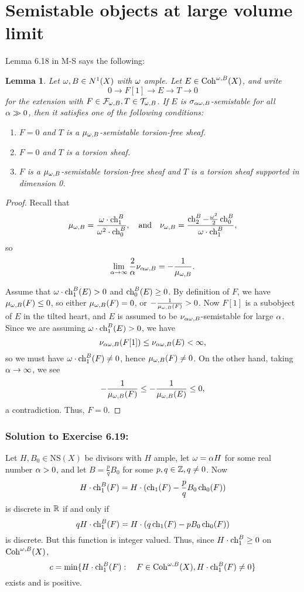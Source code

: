 \documentclass[letterpaper,10pt]{article}
\newtheorem{lem}[thm]{Lemma}
\begin{document}
\section{Semistable objects at large volume limit}
Lemma 6.18 in M-S says the following:
\begin{lem}
    Let $\omega, B \in N^1(X)$ with $\omega$ ample. Let $E \in \mathrm{Coh}^{\omega, B}(X)$, and write \[ 0 \to F[1] \to E \to T \to 0 \]
    for the extension with $F \in \mathcal{F}_{\omega, B}, T \in \mathcal{T}_{\omega, B}$. If $E$ is $\sigma_{\alpha\omega, B}$-semistable for all $\alpha \gg 0$, then it satisfies one of the following conditions:
    \begin{enumerate}[(1)]
        \item $F = 0$ and $T$ is a $\mu_{\omega, B}$-semistable torsion-free sheaf.
        \item $F = 0$ and $T$ is a torsion sheaf.
        \item $F$ is a $\mu_{\omega, B}$-semistable torsion-free sheaf and $T$ is a torsion sheaf supported in dimension 0.
    \end{enumerate}
\end{lem}
\begin{proof}
    Recall that
    \[ \mu_{\omega, B} = \frac{\omega \cdot \operatorname{\mathrm{ch}}_1^B}{\omega^2 \cdot \operatorname{\mathrm{ch}}_0^B}, \quad \mathrm{and} \quad \nu_{\omega, B} = \frac{\operatorname{\mathrm{ch}}_2^B - \frac{\omega^2}{2} \operatorname{\mathrm{ch}}_0^B}{\omega \cdot \operatorname{\mathrm{ch}}_1^B}, \]
    so
    \[ \lim_{\alpha \to \infty} \frac{2}{\alpha} \nu_{\alpha\omega, B} = - \frac{1}{\mu_{\omega, B}}. \]
    
    Assume that $\omega \cdot \operatorname{\mathrm{ch}}_1^B(E) > 0$ and $\operatorname{\mathrm{ch}}_0^B(E) \ge 0$. By definition of $F$, we have $\mu_{\omega, B}(F) \leq 0$, so either $\mu_{\omega, B}(F) = 0$, or $-\frac{1}{\mu_{\omega, B}(F)} > 0$. Now $F[1]$ is a subobject of $E$ in the tilted heart, and $E$ is assumed to be $\nu_{\alpha\omega, B}$-semistable for large $\alpha$. Since we are assuming $\omega \cdot \operatorname{\mathrm{ch}}_1^B(E) > 0$, we have 
    \[ \nu_{\alpha\omega, B}(F[1]) \le \nu_{\alpha\omega, B}(E) < \infty, \]
    so we must have $\omega\cdot \operatorname{\mathrm{ch}}_1^B(F) \neq 0$, hence $\mu_{\omega, B}(F) \neq 0$. On the other hand, taking $\alpha \to \infty$, we see
    \[ -\frac{1}{\mu_{\omega, B}(F)} \le -\frac{1}{\mu_{\omega, B}(E)} \le 0, \]
    a contradiction. Thus, $F = 0$.
\end{proof}

\subsubsection*{Solution to Exercise 6.19:} Let $H, B_0 \in \mathrm{NS}(X)$ be divisors with $H$ ample, let $\omega = \alpha H$ for some real number $\alpha > 0$, and let $B = \frac{p}{q} B_0$ for some $p, q \in \mathbb{Z}, q \neq 0$. Now 
\[ H \cdot \operatorname{\mathrm{ch}}_1^B(F) = H \cdot (\operatorname{\mathrm{ch}}_1(F) - \frac{p}{q} B_0 \operatorname{\mathrm{ch}}_0(F)) \]
is discrete in $\mathbb{R}$ if and only if
\[ q H \cdot \operatorname{\mathrm{ch}}_1^B(F) = H \cdot (q \operatorname{\mathrm{ch}}_1(F) - p B_0 \operatorname{\mathrm{ch}}_0(F)) \]
is discrete. But this function is integer valued. Thus, since $H \cdot \operatorname{\mathrm{ch}}_1^B \ge 0$ on $\mathrm{Coh}^{\omega, B}(X)$,
\[ c = \min \{ H \cdot \operatorname{\mathrm{ch}}_1^B(F): \quad F \in \mathrm{Coh}^{\omega, B}(X), H \cdot \operatorname{\mathrm{ch}}_1^B(F) \neq 0 \} \]
exists and is positive.
\end{document}
